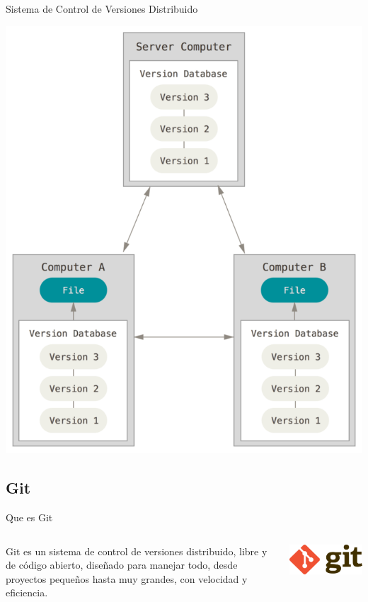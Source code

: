 \begin{frame}[c]{Sistema de Control de Versiones Distribuido}
    \begin{center}
        \includegraphics[scale=0.25]{img/scv-distributed.png}
    \end{center}
\end{frame}

\subsection{Git}

\begin{frame}[c]{Que es Git}
    \begin{columns}
        Git es un sistema de control de versiones distribuido, libre y de
        código abierto, diseñado para manejar todo, desde proyectos pequeños
        hasta muy grandes, con velocidad y eficiencia. 
        \begin{center}
            \includegraphics[scale=0.5]{img/git-logo.png}
        \end{center}
    \end{columns}
\end{frame}


